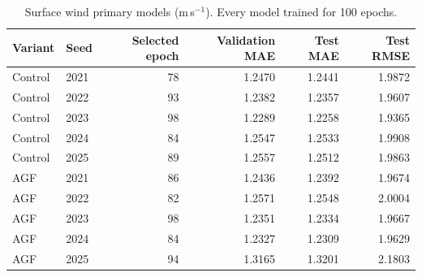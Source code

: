 \documentclass[10pt,a4paper]{article}
\begin{document}
\begin{table}[H]\centering\small\setlength{\tabcolsep}{5pt}\setlength{\parskip}{0pt}

\caption{Surface wind primary models (m\,s$^{-1}$). Every model trained for 100 epochs.}\label{tab:seeds_component_of_wind}

\begin{tabular}{llrrrr}

\toprule
Variant & Seed & Selected epoch & Validation MAE & Test MAE & Test RMSE \\
\midrule

Control & 2021 & 78 & 1.2470 & 1.2441 & 1.9872 \\

Control & 2022 & 93 & 1.2382 & 1.2357 & 1.9607 \\

Control & 2023 & 98 & 1.2289 & 1.2258 & 1.9365 \\

Control & 2024 & 84 & 1.2547 & 1.2533 & 1.9908 \\

Control & 2025 & 89 & 1.2557 & 1.2512 & 1.9863 \\

AGF & 2021 & 86 & 1.2436 & 1.2392 & 1.9674 \\

AGF & 2022 & 82 & 1.2571 & 1.2548 & 2.0004 \\

AGF & 2023 & 98 & 1.2351 & 1.2334 & 1.9667 \\

AGF & 2024 & 84 & 1.2327 & 1.2309 & 1.9629 \\

AGF & 2025 & 94 & 1.3165 & 1.3201 & 2.1803 \\

\bottomrule\end{tabular}\end{table}
\end{document}
